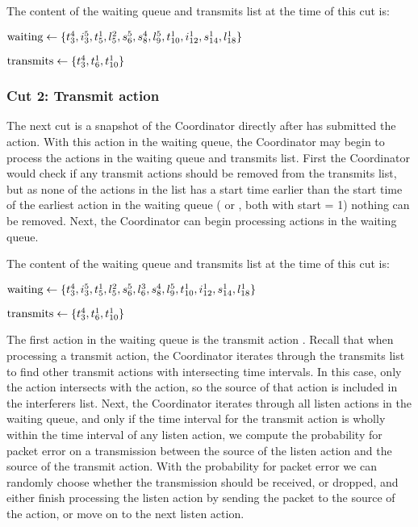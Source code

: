 The content of the waiting queue and transmits list at the time of this cut is: \smallbreak

$\text{waiting} \leftarrow \{%
    \Action{t}{4}{3}, %
    \Action{i}{5}{3}, %
    \Action{t}{1}{5}, %
    \Action{l}{2}{5}, %
    \Action{s}{5}{6}, %
    \Action{s}{4}{8}, %
    \Action{l}{5}{9}, %
    \Action{t}{1}{10}, %
    \Action{i}{1}{12}, %
    \Action{s}{1}{14}, %
    \Action{l}{1}{18} %
    \}$

$\text{transmits} \leftarrow \{ t^{4}_{3}, t^{1}_{6}, t^{1}_{10} \}$

\subsubsection{Cut 2: Transmit action}

The next cut is a snapshot of the Coordinator directly after  has submitted the  action. With this action in the waiting queue, the Coordinator may begin to process the actions in the waiting queue and transmits list. First the Coordinator would check if any transmit actions should be removed from the transmits list, but as none of the actions in the list has a start time earlier than the start time of the earliest action in the waiting queue ( or , both with start = 1) nothing can be removed. Next, the Coordinator can begin processing actions in the waiting queue. \smallbreak

The content of the waiting queue and transmits list at the time of this cut is: \smallbreak

$\text{waiting} \leftarrow \{%
    \Action{t}{4}{3}, %
    \Action{i}{5}{3}, %
    \Action{t}{1}{5}, %
    \Action{l}{2}{5}, %
    \Action{s}{5}{6}, %
    \Action{l}{3}{6}, %
    \Action{s}{4}{8}, %
    \Action{l}{5}{9}, %
    \Action{t}{1}{10}, %
    \Action{i}{1}{12}, %
    \Action{s}{1}{14}, %
    \Action{l}{1}{18} %
    \}$

$\text{transmits} \leftarrow \{ t^{4}_{3}, t^{1}_{6}, t^{1}_{10} \}$ \smallbreak


The first action in the waiting queue is the transmit action . Recall that when processing a transmit action, the Coordinator iterates through the transmits list to find other transmit actions with intersecting time intervals. In this case, only the  action intersects with the  action, so the source of that action is included in the interferers list. Next, the Coordinator iterates through all listen actions in the waiting queue, and only if the time interval for the transmit action is wholly within the time interval of any listen action, we compute the probability for packet error on a transmission between the source of the listen action and the source of the transmit action. With the probability for packet error we can randomly choose whether the transmission should be received, or dropped, and either finish processing the listen action by sending the packet to the source of the action, or move on to the next listen action. \smallbreak

